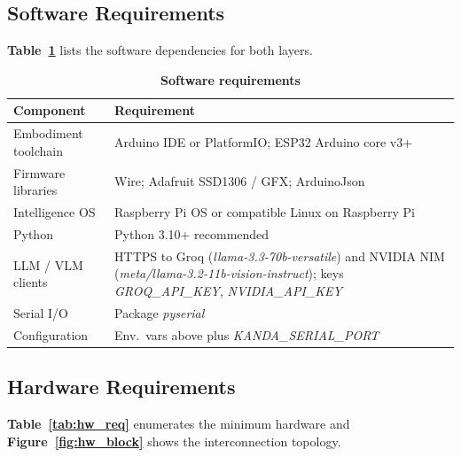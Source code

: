 \subsection{Software Requirements}
\label{subsec:sw_req}

\textbf{Table~\ref{tab:sw_req}} lists the software dependencies for both layers.

\begin{table}[H]
\centering
\caption[Software requirements]{\textbf{Software requirements}}
\label{tab:sw_req}
\begin{tabularx}{\textwidth}{|>{\raggedright\arraybackslash}p{3.2cm}|>{\raggedright\arraybackslash}X|}
\hline
\textbf{Component} & \textbf{Requirement} \\
\hline
Embodiment toolchain & Arduino IDE or PlatformIO; ESP32 Arduino core v3+ \\
\hline
Firmware libraries     & Wire; Adafruit SSD1306 / GFX; ArduinoJson \\
\hline
Intelligence OS        & Raspberry Pi OS or compatible Linux on Raspberry Pi \\
\hline
Python                 & Python 3.10+ recommended \\
\hline
LLM / VLM clients      & HTTPS to Groq (\textit{llama-3.3-70b-versatile}) and NVIDIA NIM (\textit{meta/llama-3.2-11b-vision-instruct}); keys \textit{GROQ\_API\_KEY}, \textit{NVIDIA\_API\_KEY} \\
\hline
Serial I/O             & Package \textit{pyserial} \\
\hline
Configuration          & Env.\ vars above plus \textit{KANDA\_SERIAL\_PORT} \\
\hline
\end{tabularx}
\end{table}

\subsection{Hardware Requirements}
\label{subsec:hw_req}

\textbf{Table~\ref{tab:hw_req}} enumerates the minimum hardware and \textbf{Figure~\ref{fig:hw_block}} shows the interconnection topology.

